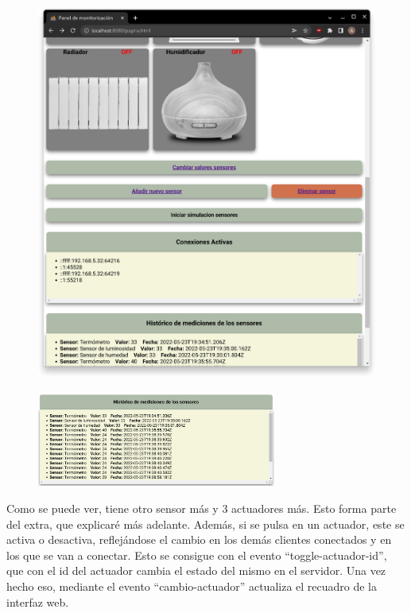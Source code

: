 \documentclass{article}
\begin{document}
\begin{figure}[H]
\begin{minipage}[H]{0.49\textwidth}
        \includegraphics[width=\textwidth]{images/pagina2.png}
    \end{minipage}
\end{figure}

\begin{figure}[H]
    \centering
    \includegraphics[width=0.7\textwidth]{images/pagina3.png}
\end{figure}

Como se puede ver, tiene otro sensor más y 3 actuadores más. Esto forma parte del extra, que explicaré más adelante. Además, si se pulsa en un actuador, este se activa o desactiva, reflejándose el cambio en los demás clientes conectados y en los que se van a conectar. Esto se consigue con el evento ``toggle-actuador-id'', que con el id del actuador cambia el estado del mismo en el servidor. Una vez hecho eso, mediante el evento ``cambio-actuador'' actualiza el recuadro de la interfaz web.
\end{document}
